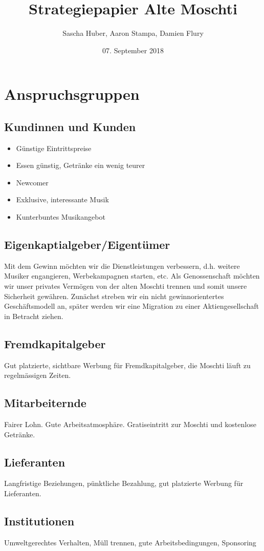 \documentclass[a4paper, titlepage]{article}
\title{Strategiepapier Alte Moschti}
\author{Sascha Huber, Aaron Stampa, Damien Flury}
\date{07. September 2018}
\begin{document}
\maketitle

\tableofcontents
\newpage

\section{Anspruchsgruppen}
\subsection{Kundinnen und Kunden}
\begin{itemize}
  \item Günstige Eintrittspreise
  \item Essen günstig, Getränke ein wenig teurer
  \item Newcomer
  \item Exklusive, interessante Musik
  \item Kunterbuntes Musikangebot
\end{itemize}
\subsection{Eigenkaptialgeber/Eigentümer}
Mit dem Gewinn möchten wir die Dienstleistungen verbessern, d.h. weitere Musiker engangieren,
Werbekampagnen starten, etc. Als Genossenschaft möchten wir unser privates Vermögen von der
alten Moschti trennen und somit unsere Sicherheit gewähren. Zunächst streben wir ein nicht gewinnorientertes
Geschäftsmodell an, später werden wir eine Migration zu einer Aktiengesellschaft in Betracht ziehen.
\subsection{Fremdkapitalgeber}
Gut platzierte, sichtbare Werbung für Fremdkapitalgeber, die Moschti läuft zu regelmässigen Zeiten.
\subsection{Mitarbeiternde}
Fairer Lohn. Gute Arbeitsatmosphäre. Gratiseintritt zur Moschti und kostenlose Getränke.
\subsection{Lieferanten}
Langfristige Beziehungen, pünktliche Bezahlung, gut platzierte Werbung für Lieferanten.
\subsection{Institutionen}
Umweltgerechtes Verhalten, Müll trennen, gute Arbeitsbedingungen, Sponsoring
\end{document}

